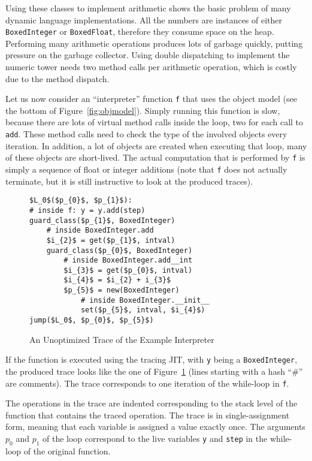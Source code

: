 \documentclass[preprint]{sigplanconf}
\begin{document}
Using these classes to implement arithmetic shows the basic problem of many
dynamic language implementations. All the numbers are instances of either
\lstinline{BoxedInteger} or \lstinline{BoxedFloat}, therefore they consume space on the
heap. Performing many arithmetic operations produces lots of garbage quickly,
putting pressure on the garbage collector. Using double dispatching to
implement the numeric tower needs two method calls per arithmetic operation,
which is costly due to the method dispatch.

Let us now consider an ``interpreter'' function \lstinline{f} that uses the
object model (see the bottom of Figure~\ref{fig:objmodel}).
Simply running this function is slow, because there are lots of virtual method
calls inside the loop, two for each
call to \lstinline{add}. These method calls need to check the type of the involved
objects every iteration. In addition, a lot of objects are created
when executing that loop, many of these objects are short-lived.
The actual computation that is performed by \lstinline{f} is simply a sequence of
float or integer additions (note that \lstinline{f} does not actually terminate,
but it is still instructive to look at the produced traces).


\begin{figure}
\begin{lstlisting}[mathescape,numbers = right,basicstyle=\setstretch{1.05}\ttfamily\scriptsize]
$L_0$($p_{0}$, $p_{1}$):
# inside f: y = y.add(step)
guard_class($p_{1}$, BoxedInteger)
    # inside BoxedInteger.add
    $i_{2}$ = get($p_{1}$, intval)
    guard_class($p_{0}$, BoxedInteger)
        # inside BoxedInteger.add__int
        $i_{3}$ = get($p_{0}$, intval)
        $i_{4}$ = $i_{2} + i_{3}$
        $p_{5}$ = new(BoxedInteger)
            # inside BoxedInteger.__init__
            set($p_{5}$, intval, $i_{4}$)
jump($L_0$, $p_{0}$, $p_{5}$)
\end{lstlisting}
\caption{An Unoptimized Trace of the Example Interpreter}
\label{fig:unopt-trace}
\end{figure}

If the function is executed using the tracing JIT, with \lstinline{y} being a
\lstinline{BoxedInteger}, the produced trace looks like the one of
Figure~\ref{fig:unopt-trace} (lines starting with a hash ``\#'' are comments).
The trace corresponds to one iteration of the while-loop in \lstinline{f}.

The operations in the trace are indented
corresponding to the stack level of the function that contains the traced
operation. The trace is in single-assignment form, meaning that each variable is
assigned a value exactly once. The arguments $p_0$ and $p_1$ of the loop correspond
to the live variables \lstinline{y} and \lstinline{step} in the while-loop of
the original function.
\end{document}
